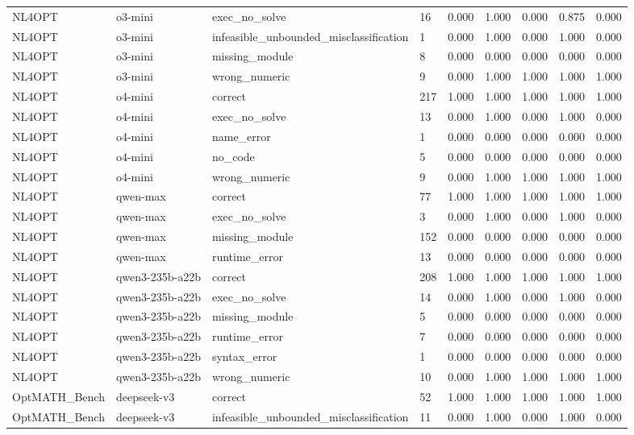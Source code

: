 \begin{table}[t]
\begin{tabular}{lllllllll}
NL4OPT & o3-mini & exec\_no\_solve & 16 & 0.000 & 1.000 & 0.000 & 0.875 & 0.000 \\
NL4OPT & o3-mini & infeasible\_unbounded\_misclassification & 1 & 0.000 & 1.000 & 0.000 & 1.000 & 0.000 \\
NL4OPT & o3-mini & missing\_module & 8 & 0.000 & 0.000 & 0.000 & 0.000 & 0.000 \\
NL4OPT & o3-mini & wrong\_numeric & 9 & 0.000 & 1.000 & 1.000 & 1.000 & 1.000 \\
NL4OPT & o4-mini & correct & 217 & 1.000 & 1.000 & 1.000 & 1.000 & 1.000 \\
NL4OPT & o4-mini & exec\_no\_solve & 13 & 0.000 & 1.000 & 0.000 & 1.000 & 0.000 \\
NL4OPT & o4-mini & name\_error & 1 & 0.000 & 0.000 & 0.000 & 0.000 & 0.000 \\
NL4OPT & o4-mini & no\_code & 5 & 0.000 & 0.000 & 0.000 & 0.000 & 0.000 \\
NL4OPT & o4-mini & wrong\_numeric & 9 & 0.000 & 1.000 & 1.000 & 1.000 & 1.000 \\
NL4OPT & qwen-max & correct & 77 & 1.000 & 1.000 & 1.000 & 1.000 & 1.000 \\
NL4OPT & qwen-max & exec\_no\_solve & 3 & 0.000 & 1.000 & 0.000 & 1.000 & 0.000 \\
NL4OPT & qwen-max & missing\_module & 152 & 0.000 & 0.000 & 0.000 & 0.000 & 0.000 \\
NL4OPT & qwen-max & runtime\_error & 13 & 0.000 & 0.000 & 0.000 & 0.000 & 0.000 \\
NL4OPT & qwen3-235b-a22b & correct & 208 & 1.000 & 1.000 & 1.000 & 1.000 & 1.000 \\
NL4OPT & qwen3-235b-a22b & exec\_no\_solve & 14 & 0.000 & 1.000 & 0.000 & 1.000 & 0.000 \\
NL4OPT & qwen3-235b-a22b & missing\_module & 5 & 0.000 & 0.000 & 0.000 & 0.000 & 0.000 \\
NL4OPT & qwen3-235b-a22b & runtime\_error & 7 & 0.000 & 0.000 & 0.000 & 0.000 & 0.000 \\
NL4OPT & qwen3-235b-a22b & syntax\_error & 1 & 0.000 & 0.000 & 0.000 & 0.000 & 0.000 \\
NL4OPT & qwen3-235b-a22b & wrong\_numeric & 10 & 0.000 & 1.000 & 1.000 & 1.000 & 1.000 \\
OptMATH\_Bench & deepseek-v3 & correct & 52 & 1.000 & 1.000 & 1.000 & 1.000 & 1.000 \\
OptMATH\_Bench & deepseek-v3 & infeasible\_unbounded\_misclassification & 11 & 0.000 & 1.000 & 0.000 & 1.000 & 0.000 \\

\end{tabular}
\end{table}
